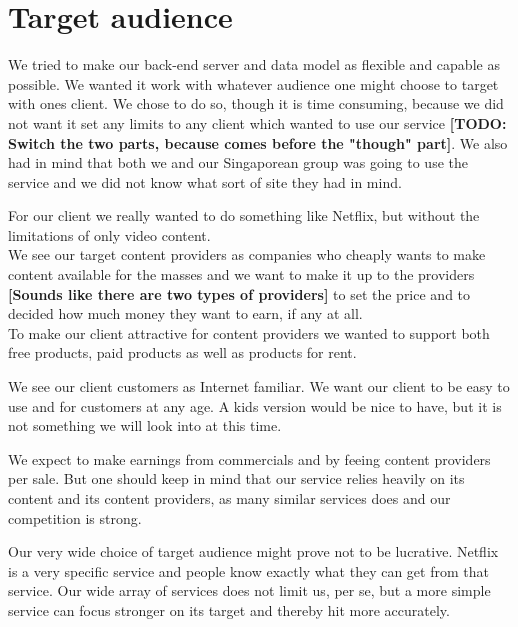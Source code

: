 \section{Target audience}
We tried to make our back-end server and data model as flexible and capable as possible. We wanted it work with whatever audience one might choose to target with ones client. We chose to do so, though it is time consuming, because we did not want it set any limits to any client which wanted to use our service \textbf{[TODO: Switch the two parts, because comes before the "though" part]}. We also had in mind that both we and our Singaporean group was going to use the service and we did not know what sort of site they had in mind.

For our client we really wanted to do something like Netflix, but without the limitations of only video content. 
\\We see our target content providers as companies who cheaply wants to make content available for the masses and we want to make it up to the providers \textbf{[Sounds like there are two types of providers]} to set the price and to decided how much money they want to earn, if any at all.
\\To make our client attractive for content providers we wanted to support both free products, paid products as well as products for rent.

We see our client customers as Internet familiar. We want our client to be easy to use and for customers at any age. A kids version would be nice to have, but it is not something we will look into at this time.

We expect to make earnings from commercials and by feeing content providers per sale. But one should keep in mind that our service relies heavily on its content and its content providers, as many similar services does and our competition is strong.

Our very wide choice of target audience might prove not to be lucrative. Netflix is a very specific service and people know exactly what they can get from that service. Our wide array of services does not limit us, per se, but a more simple service can focus stronger on its target and thereby hit more accurately.
\newpage